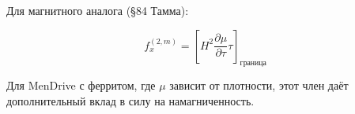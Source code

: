 \documentclass[a4paper,10pt]{article}
\newcommand{\modblock}[1]{\colorbox{modcolor!10}{\parbox{\dimexpr\linewidth-2\fboxsep}{#1}}}
\begin{document}




\modblock{

Для магнитного аналога (§84 Тамма):

\begin{equation}
f_x^{(2,m)} = \left[H^2\frac{\partial\mu}{\partial\tau}\tau\right]_{\text{граница}}
\label{eq:force_term_2_magnetic}
\end{equation}

Для MenDrive с ферритом, где $\mu$ зависит от плотности,
этот член даёт дополнительный вклад в силу на намагниченность.

}%
\end{document}
